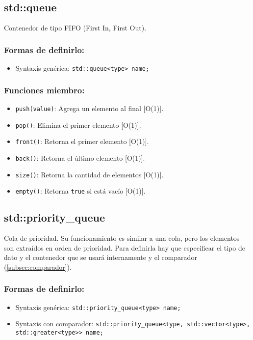 \subsection{std::queue}
\label{subsec:std_queue}
Contenedor de tipo FIFO (First In, First Out). 

\subsubsection*{Formas de definirlo:}
\begin{itemize}
  \item Syntaxis genérica: \texttt{std::queue<type> name;}
\end{itemize}

\subsubsection*{Funciones miembro:}
\begin{itemize}
  \item \texttt{push(value)}: Agrega un elemento al final [O(1)].
  \item \texttt{pop()}: Elimina el primer elemento [O(1)].
  \item \texttt{front()}: Retorna el primer elemento [O(1)].
  \item \texttt{back()}: Retorna el último elemento [O(1)].
  \item \texttt{size()}: Retorna la cantidad de elementos [O(1)].
  \item \texttt{empty()}: Retorna \texttt{true} si está vacío [O(1)]. 
\end{itemize}

\subsection{std::priority\_queue}
\label{subsec:std_priority_queue}
Cola de prioridad. Su funcionamiento es similar a una cola, pero los elementos son extraídos en orden de prioridad. Para definirla hay que especificar el tipo de dato y el contenedor que se usará internamente y el comparador (\ref{subsec:comparador}).

\subsubsection*{Formas de definirlo:}
\begin{itemize}
  \item Syntaxis genérica: \texttt{std::priority\_queue<type> name;}
  \item Syntaxis con comparador: \texttt{std::priority\_queue<type, std::vector<type>, std::greater<type>> name;}
\end{itemize}

